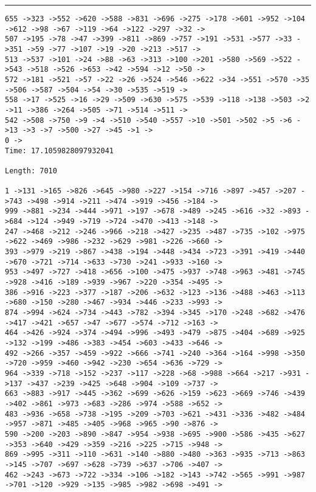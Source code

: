 \documentclass[letter, 12pt]{article}
\newenvironment{question}[1]{%
    \vspace{.2in}%
        \noindent{\bf #1}%
    \vspace{0.3em} \hrule \vspace{.1in}%
}{}
\begin{document}
\begin{question}{\large Appendix}
\begin{lstlisting}[style=CStyle]
655 ->323 ->552 ->620 ->588 ->831 ->696 ->275 ->178 ->601 ->952 ->104 ->612 ->98 ->67 ->119 ->64 ->122 ->297 ->32 ->
507 ->195 ->78 ->47 ->399 ->811 ->869 ->757 ->191 ->531 ->577 ->33 ->351 ->59 ->77 ->107 ->19 ->20 ->213 ->517 ->
513 ->537 ->101 ->24 ->88 ->63 ->313 ->100 ->201 ->580 ->569 ->522 ->543 ->518 ->526 ->653 ->42 ->594 ->12 ->50 ->
572 ->181 ->521 ->57 ->22 ->26 ->524 ->546 ->622 ->34 ->551 ->570 ->35 ->506 ->587 ->504 ->54 ->30 ->535 ->519 ->
558 ->17 ->525 ->16 ->29 ->509 ->630 ->575 ->539 ->118 ->138 ->503 ->2 ->11 ->386 ->264 ->505 ->71 ->514 ->511 ->
542 ->508 ->750 ->9 ->4 ->510 ->540 ->557 ->10 ->501 ->502 ->5 ->6 ->13 ->3 ->7 ->500 ->27 ->45 ->1 ->
0 ->
Time: 17.1059828097932041

Length: 7010

1 ->131 ->165 ->826 ->645 ->980 ->227 ->154 ->716 ->897 ->457 ->207 ->743 ->498 ->914 ->211 ->474 ->919 ->456 ->184 ->
999 ->881 ->234 ->444 ->971 ->197 ->678 ->489 ->245 ->616 ->32 ->893 ->684 ->124 ->949 ->719 ->724 ->470 ->413 ->148 ->
247 ->468 ->212 ->246 ->966 ->218 ->427 ->235 ->487 ->735 ->102 ->975 ->622 ->469 ->986 ->232 ->629 ->981 ->226 ->660 ->
393 ->979 ->219 ->867 ->438 ->194 ->448 ->434 ->723 ->391 ->419 ->440 ->670 ->721 ->714 ->633 ->730 ->241 ->933 ->160 ->
953 ->497 ->727 ->418 ->656 ->100 ->475 ->937 ->748 ->963 ->481 ->745 ->928 ->416 ->189 ->939 ->967 ->220 ->354 ->495 ->
386 ->916 ->223 ->377 ->187 ->206 ->632 ->123 ->136 ->488 ->463 ->113 ->680 ->150 ->280 ->467 ->934 ->446 ->233 ->993 ->
874 ->994 ->624 ->734 ->443 ->782 ->394 ->345 ->170 ->248 ->682 ->476 ->417 ->421 ->657 ->47 ->677 ->574 ->712 ->163 ->
464 ->426 ->924 ->374 ->494 ->996 ->493 ->479 ->875 ->404 ->689 ->925 ->132 ->199 ->486 ->383 ->454 ->603 ->433 ->646 ->
492 ->266 ->357 ->459 ->922 ->666 ->741 ->240 ->364 ->164 ->998 ->350 ->720 ->959 ->460 ->942 ->230 ->654 ->636 ->729 ->
964 ->339 ->718 ->152 ->237 ->117 ->228 ->68 ->988 ->664 ->217 ->931 ->137 ->437 ->239 ->425 ->648 ->904 ->109 ->737 ->
663 ->883 ->917 ->445 ->362 ->699 ->626 ->159 ->623 ->669 ->746 ->439 ->402 ->861 ->973 ->683 ->286 ->974 ->588 ->652 ->
483 ->936 ->658 ->738 ->195 ->209 ->703 ->621 ->431 ->336 ->482 ->484 ->957 ->871 ->485 ->405 ->968 ->965 ->90 ->876 ->
590 ->200 ->203 ->890 ->847 ->954 ->938 ->695 ->900 ->586 ->435 ->627 ->353 ->640 ->429 ->359 ->216 ->225 ->715 ->948 ->
869 ->995 ->311 ->110 ->631 ->140 ->880 ->480 ->363 ->935 ->713 ->863 ->145 ->707 ->697 ->628 ->739 ->637 ->706 ->407 ->
462 ->243 ->673 ->722 ->334 ->106 ->182 ->143 ->742 ->565 ->991 ->987 ->701 ->120 ->929 ->135 ->985 ->982 ->698 ->491 ->

\end{lstlisting}
\end{question}
\end{document}
